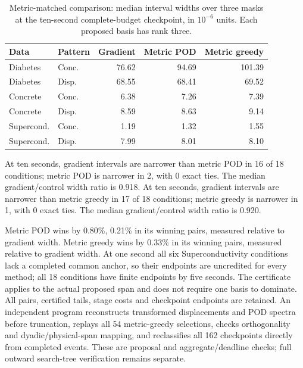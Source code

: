 \begin{table}[t]\centering\small\setlength{\tabcolsep}{4pt}
\caption{Metric-matched comparison: median interval widths over three masks at the ten-second complete-budget checkpoint, in $10^{-6}$ units. Each proposed basis has rank three.}\label{tab:metric-v79}
\begin{tabular}{llrrr}\toprule Data&Pattern&Gradient&Metric POD&Metric greedy\\\midrule
Diabetes&Conc.&76.62&94.69&101.39\\
Diabetes&Disp.&68.55&68.41&69.52\\
Concrete&Conc.&6.38&7.26&7.39\\
Concrete&Disp.&8.59&8.63&9.14\\
Supercond.&Conc.&1.19&1.32&1.55\\
Supercond.&Disp.&7.99&8.01&8.10\\
\bottomrule\end{tabular}\end{table}
At ten seconds, gradient intervals are narrower than metric POD in 16 of 18 conditions; metric POD is narrower in 2, with 0 exact ties. The median gradient/control width ratio is 0.918. At ten seconds, gradient intervals are narrower than metric greedy in 17 of 18 conditions; metric greedy is narrower in 1, with 0 exact ties. The median gradient/control width ratio is 0.920. 

Metric POD wins by 0.80\%, 0.21\% in its winning pairs, measured relative to gradient width. Metric greedy wins by 0.33\% in its winning pairs, measured relative to gradient width. At one second all six Superconductivity conditions lack a completed common anchor, so their endpoints are uncredited for every method; all 18 conditions have finite endpoints by five seconds. The certificate applies to the actual proposed span and does not require one basis to dominate. All pairs, certified tails, stage costs and checkpoint endpoints are retained. An independent program reconstructs transformed displacements and POD spectra before truncation, replays all 54 metric-greedy selections, checks orthogonality and dyadic/physical-span mapping, and reclassifies all 162 checkpoints directly from completed events. These are proposal and aggregate/deadline checks; full outward search-tree verification remains separate.
